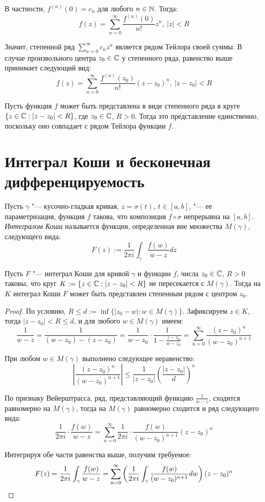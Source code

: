 \begin{note}
	В частности, $f^{(n)}(0) = c_n$ для любого $n \in \mathbb{N}$. Тогда:
	\[f(z) = \sum_{n=0}^\infty \frac{f^{(n)}(0)}{n!}z^n,~|z| < R\]
	
	Значит, степенной ряд $\sum_{n=0}^\infty c_nz^n$ является рядом Тейлора своей суммы. В случае произвольного центра $z_0 \in \mathbb{C}$ у степенного ряда, равенство выше принимает следующий вид:
	\[f(z) = \sum_{n=0}^\infty \frac{f^{(n)}(z_0)}{n!}(z - z_0)^n,~|z - z_0| < R\]
\end{note}

\begin{note}
	Пусть функция $f$ может быть представлена в виде степенного ряда в круге $\{z \in \mathbb{C} : |z - z_0| < R\}$, где $z_0 \in \mathbb{C}$, $R > 0$. Тогда это представление единственно, поскольку оно совпадает с рядом Тейлора функции $f$.
\end{note}

\section{Интеграл Коши и бесконечная дифференцируемость}

\begin{definition}
	Пусть $\gamma$ "--- кусочно-гладкая кривая, $z = \sigma(t)$, $t \in [a, b]$, "--- ее параметризация, функция $f$ такова, что композиция $f\circ\sigma$ непрерывна на $[a, b]$. \textit{Интегралом Коши} называется функция, определенная вне множества $M(\gamma)$, следующего вида:
	\[F(z) := \frac1{2\pi i}\int_\gamma \frac{f(w)}{w - z}dz\]
\end{definition}

\begin{theorem}
	Пусть $F$ "--- интеграл Коши для кривой $\gamma$ и функции $f$, числа $z_0 \in \mathbb{C}$, $R > 0$ таковы, что круг $K := \{z \in \mathbb{C}: |z - z_0| < R\}$ не пересекается с $M(\gamma)$. Тогда на $K$ интеграл Коши $F$ может быть представлен степенным рядом с центром $z_0$.
\end{theorem}

\begin{proof}
	По условию, $R \le d := \inf\{|z_0 - w| : w \in M(\gamma)\}$. Зафиксируем $z \in K$, тогда $|z - z_0| < R \le d$, и для любого $w \in M(\gamma)$ имеем:
	\[\frac1{w - z} = \frac1{(w-z_0) - (z - z_0)} = \frac1{w-z_0}\cdot \frac1{1 - \frac{z-z_0}{w - z_0}} = \sum_{n=0}^\infty\frac{(z-z_0)^n}{(w-z_0)^{n + 1}}\]
	
	При любом $w \in M(\gamma)$ выполнено следующее неравенство:
	\[\left|\frac{(z-z_0)^n}{(w-z_0)^{n + 1}}\right| \le \frac{1}{|z - z_0|}\left(\frac{|z - z_0|}{d}\right)^n\]
	
	По признаку Вейерштрасса, ряд, представляющий функцию $\frac1{w - z}$, сходится равномерно на $M(\gamma)$, тогда на $M(\gamma)$ равномерно сходится и ряд следующего вида:
	\[\frac1{2\pi i} \cdot\frac{f(w)}{w-z} = \sum_{n=0}^\infty\frac1{2\pi i}\cdot \frac{f(w)}{(w-z_0)^{n + 1}}(z-z_0)^n\]
	
	Интегрируя обе части равенства выше, получим требуемое:
	\[F(z) = \frac1{2\pi i} \int_\gamma \frac{f(w)}{w-z} = \sum_{n=0}^\infty\left(\frac1{2\pi i} \int_\gamma\frac{f(w)}{(w-z_0)^{n + 1}}dw\right)(z-z_0)^n \qedhere\]
\end{proof}

